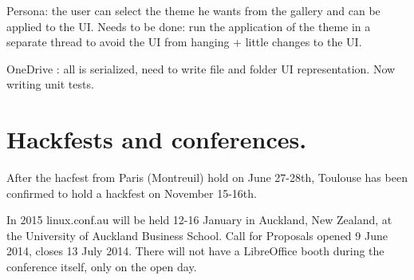 \documentclass{article}
\begin{document}
Persona: the user can select the theme he wants from the gallery and can
be applied to the UI.
Needs to be done: run the application of the theme in a separate thread
to avoid the UI from hanging + little changes to the UI.

OneDrive : all is serialized, need to write file and folder UI
representation. Now writing unit tests.



\section{Hackfests and conferences.}

After the hacfest from Paris (Montreuil) hold on June 27-28th, Toulouse
has been confirmed to hold a hackfest on November 15-16th\cite{hackfestToulouse1}.

In 2015 linux.conf.au will be held 12-16 January in Auckland, New
Zealand, at the University of Auckland Business School.
Call for Proposals opened 9 June 2014, closes 13 July 2014\cite{linuxConfAuckland1}. There will not have a LibreOffice booth during the conference itself, only on the open day\cite{linuxConfAuckland2}.
\end{document}
